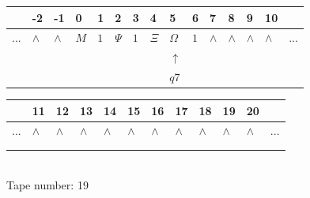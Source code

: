 \documentclass[11pt]{article}
\begin{document}
\begin{table}[H]
\centering
\begin{tabular}{lllllllllllllll}
 & -2 & -1 & 0 & 1 & 2 & 3 & 4 & 5 & 6 & 7 & 8 & 9 & 10 & \\
\hline
$...$ & \multicolumn{1}{|l|}{$\wedge$} & \multicolumn{1}{|l|}{$\wedge$} & \multicolumn{1}{|l|}{$M$} & \multicolumn{1}{|l|}{$1$} & \multicolumn{1}{|l|}{$\Psi$} & \multicolumn{1}{|l|}{$1$} & \multicolumn{1}{|l|}{$\Xi$} & \multicolumn{1}{|l|}{$\Omega$} & \multicolumn{1}{|l|}{$1$} & \multicolumn{1}{|l|}{$\wedge$} & \multicolumn{1}{|l|}{$\wedge$} & \multicolumn{1}{|l|}{$\wedge$} & \multicolumn{1}{|l|}{$\wedge$} & $...$\\
\hline
&  &  &  &  &  &  &  & $\uparrow$ &  &  &  &  &  &  \\
&  &  &  &  &  &  &  & $ q7 $ &  &  &  &  &  &  \\
\end{tabular}
\begin{tabular}{llllllllllll}
 & 11 & 12 & 13 & 14 & 15 & 16 & 17 & 18 & 19 & 20 & \\
\hline
$...$ & \multicolumn{1}{|l|}{$\wedge$} & \multicolumn{1}{|l|}{$\wedge$} & \multicolumn{1}{|l|}{$\wedge$} & \multicolumn{1}{|l|}{$\wedge$} & \multicolumn{1}{|l|}{$\wedge$} & \multicolumn{1}{|l|}{$\wedge$} & \multicolumn{1}{|l|}{$\wedge$} & \multicolumn{1}{|l|}{$\wedge$} & \multicolumn{1}{|l|}{$\wedge$} & \multicolumn{1}{|l|}{$\wedge$} & $...$\\
\hline
&  &  &  &  &  &  &  &  &  &  &  \\
&  &  &  &  &  &  &  &  &  &  &  \\
\end{tabular}
\\
Tape number: 19
\noindent\makebox[\linewidth]{\hdashrule{\textwidth}{1pt}{1pt}}\end{table}
\clearpage
\end{document}

